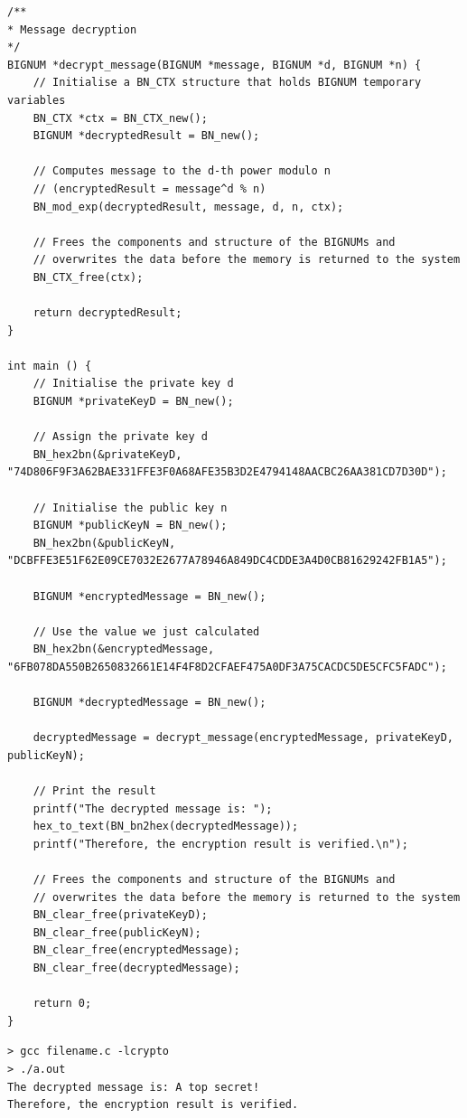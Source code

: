\documentclass[12pt]{article}
\begin{document}
\begin{lstlisting}
/**
* Message decryption
*/
BIGNUM *decrypt_message(BIGNUM *message, BIGNUM *d, BIGNUM *n) {
    // Initialise a BN_CTX structure that holds BIGNUM temporary variables
    BN_CTX *ctx = BN_CTX_new();
    BIGNUM *decryptedResult = BN_new();

    // Computes message to the d-th power modulo n
    // (encryptedResult = message^d % n)
    BN_mod_exp(decryptedResult, message, d, n, ctx);

    // Frees the components and structure of the BIGNUMs and
    // overwrites the data before the memory is returned to the system
    BN_CTX_free(ctx);

    return decryptedResult;
}

int main () {
    // Initialise the private key d
    BIGNUM *privateKeyD = BN_new();

    // Assign the private key d
    BN_hex2bn(&privateKeyD, "74D806F9F3A62BAE331FFE3F0A68AFE35B3D2E4794148AACBC26AA381CD7D30D");

    // Initialise the public key n
    BIGNUM *publicKeyN = BN_new();
    BN_hex2bn(&publicKeyN, "DCBFFE3E51F62E09CE7032E2677A78946A849DC4CDDE3A4D0CB81629242FB1A5");

    BIGNUM *encryptedMessage = BN_new();

    // Use the value we just calculated
    BN_hex2bn(&encryptedMessage, "6FB078DA550B2650832661E14F4F8D2CFAEF475A0DF3A75CACDC5DE5CFC5FADC");

    BIGNUM *decryptedMessage = BN_new();

    decryptedMessage = decrypt_message(encryptedMessage, privateKeyD, publicKeyN);

    // Print the result
    printf("The decrypted message is: ");
    hex_to_text(BN_bn2hex(decryptedMessage));
    printf("Therefore, the encryption result is verified.\n");

    // Frees the components and structure of the BIGNUMs and
    // overwrites the data before the memory is returned to the system            
    BN_clear_free(privateKeyD); 
    BN_clear_free(publicKeyN); 
    BN_clear_free(encryptedMessage);
    BN_clear_free(decryptedMessage);

    return 0;    
}
\end{lstlisting}

\begin{framed}
    \begin{verbatim}
> gcc filename.c -lcrypto
> ./a.out
The decrypted message is: A top secret!
Therefore, the encryption result is verified.
    \end{verbatim}
\end{framed}
\end{document}
